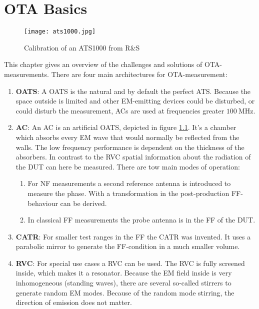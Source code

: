 \chapter{OTA Basics}


\begin{figure}[H]
\centering
\texttt{[image: ats1000.jpg]}
\caption{Calibration of an ATS1000 from R\&{}S}
\label{fig:ats}
\end{figure}

This chapter gives an overview of the challenges and solutions of \ac{OTA}-measurements. There are four main architectures for \ac{OTA}-measurement: \cite{ach}

\begin{enumerate}
\item \textbf{\acf{OATS}}: A \ac{OATS} is the natural and by default the perfect \ac{ATS}. Because the space outside is limited and other \ac{EM}-emitting devices could be disturbed, or could disturb the measurement, \acp{AC} are used at frequencies greater $\SI{100}{\mega\hertz}$.
\item \textbf{\acf{AC}}: An \ac{AC} is an artificial \ac{OATS}, depicted in figure \ref{fig:ats}. It's a  chamber which absorbs every \ac{EM} wave that would normally be reflected from the walls. The low frequency performance is dependent on the thickness of the absorbers. In contrast to the \ac{RVC} spatial information about the radiation of the \ac{DUT} can here be measured. There are tow main modes of operation:\begin{enumerate}
\item For \ac{NF} measurements a second reference antenna is introduced to measure the phase. With a transformation in the post-production \ac{FF}-behaviour can be derived.
\item In classical \ac{FF} measurements the probe antenna is in the \ac{FF} of the \ac{DUT}.
\end{enumerate}
\item \textbf{\acf{CATR}}: For smaller test ranges in the \ac{FF} the \ac{CATR} was invented. It uses a parabolic mirror to generate the \ac{FF}-condition in a much smaller volume.
\item \textbf{\acf{RVC}}: For special use cases a \ac{RVC} can be used. The \ac{RVC} is fully screened inside, which makes it a resonator. Because the \ac{EM} field inside is very inhomogeneous (standing waves), there are several so-called stirrers to generate random \ac{EM} modes. Because of the random mode stirring, the direction of emission does not matter.
\end{enumerate}


